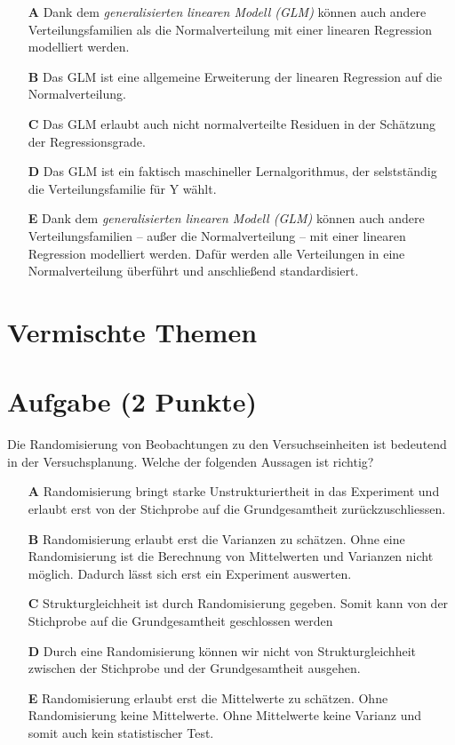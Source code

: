 \documentclass[a4paper, 9pt]{scrartcl}\usepackage[]{graphicx}\usepackage[]{xcolor}
\begin{document}
\begin{enumerate}
\item [\textbf{A} \msquare] Dank dem \textit{generalisierten linearen Modell (GLM)} können auch andere Verteilungsfamilien als die Normalverteilung mit einer linearen Regression modelliert werden.
\item [\textbf{B} \msquare] Das GLM ist eine allgemeine Erweiterung der linearen Regression auf die Normalverteilung.
\item [\textbf{C} \msquare] Das GLM erlaubt auch nicht normalverteilte Residuen in der Schätzung der Regressionsgrade.
\item [\textbf{D} \msquare] Das GLM ist ein faktisch maschineller Lernalgorithmus, der selstständig die Verteilungsfamilie für Y wählt.
\item [\textbf{E} \msquare] Dank dem \textit{generalisierten linearen Modell (GLM)} können auch andere Verteilungsfamilien -- außer die Normalverteilung -- mit einer linearen Regression modelliert werden. Dafür werden alle Verteilungen in eine Normalverteilung überführt und anschließend standardisiert.
\end{enumerate}
\section*{Vermischte Themen}  

\section{Aufgabe \hfill (2 Punkte)}

Die Randomisierung von Beobachtungen zu den Versuchseinheiten
ist bedeutend in der Versuchsplanung. Welche der folgenden Aussagen ist richtig?



\begin{enumerate}
\item [\textbf{A} \msquare] Randomisierung bringt starke Unstrukturiertheit in das Experiment und erlaubt erst von der Stichprobe auf die Grundgesamtheit zurückzuschliessen.
\item [\textbf{B} \msquare] Randomisierung erlaubt erst die Varianzen zu schätzen. Ohne eine Randomisierung ist die Berechnung von Mittelwerten und Varianzen nicht möglich. Dadurch lässt sich erst ein Experiment auswerten.
\item [\textbf{C} \msquare] Strukturgleichheit ist durch Randomisierung gegeben. Somit kann von der Stichprobe auf die Grundgesamtheit geschlossen werden
\item [\textbf{D} \msquare] Durch eine Randomisierung können wir nicht von Strukturgleichheit zwischen der Stichprobe und der Grundgesamtheit ausgehen.
\item [\textbf{E} \msquare] Randomisierung erlaubt erst die Mittelwerte zu schätzen. Ohne Randomisierung keine Mittelwerte. Ohne Mittelwerte keine Varianz und somit auch kein statistischer Test.
\end{enumerate}
\end{document}
